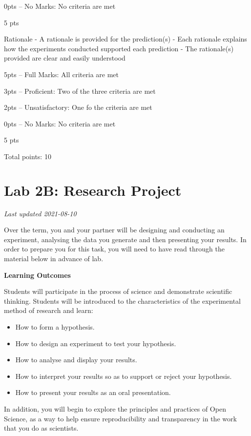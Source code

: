 \documentclass[
]{book}
\providecommand{\tightlist}{%
  \setlength{\itemsep}{0pt}\setlength{\parskip}{0pt}}
\begin{document}
0pts -- No Marks: No criteria are met

5 pts

Rationale
- A rationale is provided for the prediction(s)
- Each rationale explains how the experiments conducted supported each prediction
- The rationale(s) provided are clear and easily understood

5pts -- Full Marks: All criteria are met

3pts -- Proficient: Two of the three criteria are met

2pts -- Unsatisfactory: One fo the criteria are met

0pts -- No Marks: No criteria are met

5 pts

Total points: 10

\hypertarget{lab-2b-research-project}{%
\chapter*{Lab 2B: Research Project}\label{lab-2b-research-project}}

\emph{Last updated 2021-08-10}

Over the term, you and your partner will be designing and conducting an experiment, analysing the data you generate and then presenting your results. In order to prepare you for this task, you will need to have read through the material below in advance of lab.

\textbf{Learning Outcomes}

Students will participate in the process of science and demonstrate scientific thinking. Students will be introduced to the characteristics of the experimental method of research and learn:

\begin{itemize}
\tightlist
\item
  How to form a hypothesis.
\item
  How to design an experiment to test your hypothesis.
\item
  How to analyse and display your results.
\item
  How to interpret your results so as to support or reject your hypothesis.
\item
  How to present your results as an oral presentation.
\end{itemize}

In addition, you will begin to explore the principles and practices of Open Science, as a way to help ensure reproducibility and transparency in the work that you do as scientists.
\end{document}
